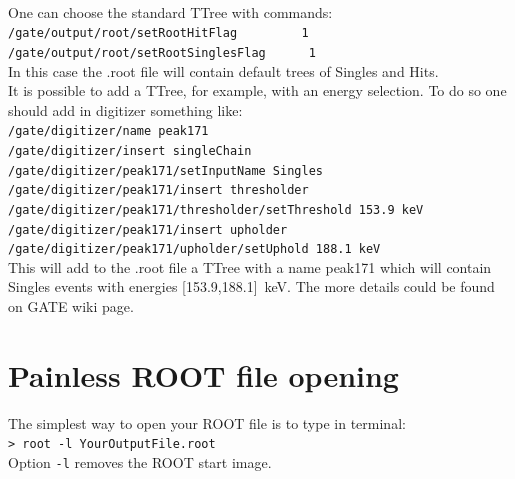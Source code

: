 \documentclass[12pt]{article}
\begin{document}
\

One can choose the standard TTree with commands:\\
\verb|/gate/output/root/setRootHitFlag         1| \\
\verb|/gate/output/root/setRootSinglesFlag      1| \\
In this case the .root file will contain default trees of Singles and Hits.\\
 

It is possible to add a TTree, for example, with an energy selection. To do so one should add in digitizer something like: \\
\verb|/gate/digitizer/name peak171| \\
\verb|/gate/digitizer/insert singleChain| \\
\verb|/gate/digitizer/peak171/setInputName Singles| \\
\verb|/gate/digitizer/peak171/insert thresholder| \\
\verb|/gate/digitizer/peak171/thresholder/setThreshold 153.9 keV| \\
\verb|/gate/digitizer/peak171/insert upholder| \\
\verb|/gate/digitizer/peak171/upholder/setUphold 188.1 keV| \\
This will add to the .root file a TTree with a name peak171 which will contain Singles events with energies [153.9,188.1]~keV. The more details could be found on GATE wiki page.
 

\section{Painless ROOT file opening}
The simplest way to open your ROOT file is to type in terminal:\\
\verb|> root -l YourOutputFile.root |\\
Option \verb|-l| removes the ROOT start image. 
\end{document}
